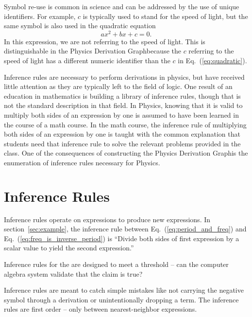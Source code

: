 \documentclass{article}
\newcommand{\eqn}[1]{Eq.\ (\ref{#1})}
\newcommand{\pdg}{Physics Derivation Graph}
\begin{document}
\begin{multicols}{2}
Symbol re-use is common in science and can be addressed by the use of unique identifiers. For example, $c$ is typically used to stand for the speed of light, but the same symbol is also used in the quadratic equation
\begin{equation}
a x^2+b x+c =0.
\label{eq:quadratic}
\end{equation}
In this expression, we are not referring to the speed of light. This is distinguishable in the \pdg because the $c$ referring to the speed of light has a different numeric identifier than the $c$ in \eqn{eq:quadratic}. 

Inference rules are necessary to perform derivations in physics, but have received little attention as they are typically left to the field of logic. One result of an education in mathematics is building a library of inference rules, though that is not the standard description in that field. In Physics, knowing that it is valid to multiply both sides of an expression by one is assumed to have been learned in the course of a math course. In the math course, the inference rule of multiplying both sides of an expression by one is taught with the common explanation that students need that inference rule to solve the relevant problems provided in the class. 
One of the consequences of constructing the \pdg is the enumeration of inference rules necessary for Physics. 

\section{Inference Rules\label{sec:inference_rules}}

Inference rules operate on expressions to produce new expressions. In section~\ref{sec:example}, the inference rule between \eqn{eq:period_and_freq} and \eqn{eq:freq_is_inverse_period} is ``Divide both sides of first expression by a scalar value to yield the second expression.''

Inference rules for the \pgd are designed to meet a threshold -- can the computer algebra system validate that the claim is true?

Inference rules are meant to catch simple mistakes like not carrying the negative symbol through a derivation or unintentionally dropping a term. The inference rules are first order -- only between nearest-neighbor expressions.




\end{multicols}
\end{document}
